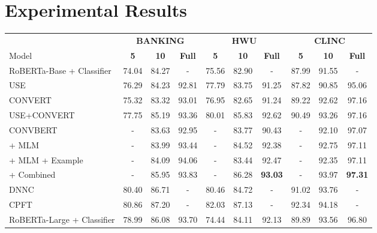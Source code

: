 \documentclass[11pt]{article}
\begin{document}
\section{Experimental Results}
\label{sec:results}





\begin{table*}[t!]
\centering
\small
\begin{tabular}{lccccccccc}
\Xhline{2\arrayrulewidth}
                        & \multicolumn{3}{c}{\textbf{BANKING}} &  \multicolumn{3}{c}{\textbf{HWU}} &\multicolumn{3}{c}{\textbf{CLINC}}\\
                        Model & \textbf{5} & \textbf{10} & \textbf{Full} & \textbf{5} &  \textbf{10} & \textbf{Full}  & \textbf{5} & \textbf{10} & \textbf{Full} \\
                        \hline
                        RoBERTa-{\small Base} + Classifier & 74.04 & 84.27 & - & 75.56 & 82.90 & - & 87.99 & 91.55 & -\\
                        USE &  76.29 & 84.23 & 92.81  & 77.79 & 83.75 & 91.25 & 87.82 & 90.85 & 95.06 \\
                        C{\small ONVE}RT & 75.32 & 83.32 & 93.01 & 76.95 & 82.65 & 91.24 & 89.22 & 92.62 & 97.16 \\
                        USE+C{\small ONVE}RT & 77.75 & 85.19 & 93.36 & 80.01 & 85.83 & 92.62 & 90.49 & 93.26 & 97.16\\
                        C{\small ONV}BERT & - & 83.63 & 92.95 & - & 83.77 & 90.43 & - & 92.10 & 97.07 \\
\quad + MLM & - & 83.99 & 93.44 & - & 84.52 & 92.38 & - & 92.75 & 97.11 \\
                        \quad + MLM + Example
                        & - & 84.09 & 94.06 & - & 83.44 & 92.47 & - & 92.35 & 97.11 \\
\quad + Combined & - &  85.95  & 93.83 & - & 86.28 & {\bf 93.03} & - & 93.97 & {\bf 97.31} \\
                        DNNC & 80.40 & 86.71 & - & 80.46 & 84.72 & - & 91.02 & 93.76 & - \\
                        CPFT & 80.86 & 87.20 & - & 82.03 & 87.13 & - & 92.34 & 94.18 & - \\
                        \hline
                        RoBERTa-{\small Large} + Classifier
                        & 78.99 & 86.08 & 93.70 & 74.44 &  84.11 & 92.13 & 89.89 & 93.56 & 96.80 \\

\end{tabular}
\end{table*}
\end{document}
